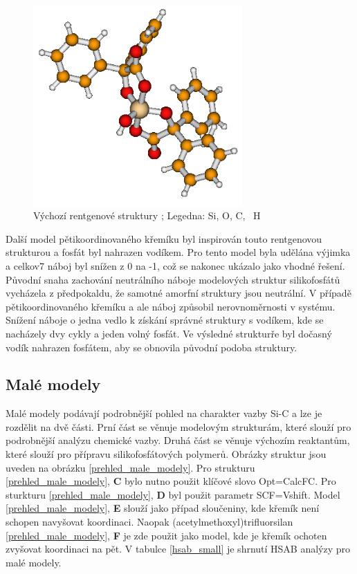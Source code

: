 \documentclass[
  digital, %
  table,   %
  lof,     %
  lot,     %
  oneside,
]{fithesis3}
\begin{document}
\begin{figure}
\begin{center}
\includegraphics[width=8cm]{rtg_5_koordinace.png}
\caption{Výchozí rentgenové struktury \cite{rtg_5};  Legedna:  Si,  O,  C, ~H}
\label{rtg_5}
\end{center}
\end{figure}
Další model pětikoordinovaného křemíku byl inspirován touto rentgenovou strukturou a fosfát byl nahrazen vodíkem. Pro tento model byla udělána výjimka a celkov7 náboj byl snížen z 0 na -1, což se nakonec ukázalo jako vhodné řešení. Původní snaha zachování neutrálního náboje modelových struktur silikofosfátů vycházela z předpokaldu, že samotné amorfní struktury jsou neutrální. V případě pětikoordinovaného křemíku a ale náboj způsobil nerovnoměrnosti v systému. Snížení náboje o jedna vedlo k získání správné struktury s vodíkem, kde se nacházely dvy cykly a jeden volný fosfát. Ve výsledné strukturře byl dočasný vodík nahrazen fosfátem, aby se obnovila původní podoba struktury.

\subsection{Malé modely}
Malé modely podávají podrobnější pohled na charakter vazby Si-C a lze je rozdělit na dvě části. Prní část se věnuje modelovým strukturám, které slouží pro podrobnější analýzu chemické vazby. Druhá část se věnuje výchozím reaktantům, které slouží pro přípravu silikofosfátových polymerů. Obrázky struktur jsou uveden na obrázku \ref{prehled_male_modely}. Pro strukturu  \ref{prehled_male_modely}, \textbf{C} bylo nutno použit klíčové slovo Opt=CalcFC. Pro sturkturu  \ref{prehled_male_modely},  \textbf{D} byl použit parametr SCF=Vshift. Model  \ref{prehled_male_modely}, \textbf{E} slouží jako případ sloučeniny, kde křemík není schopen navyšovat koordinaci. Naopak (acetylmethoxyl)trifluorsilan \ref{prehled_male_modely}, \textbf{F} je zde použit jako model, kde je křemík ochoten zvyšovat koordinaci na pět. V tabulce \ref{hsab_small} je shrnutí HSAB analýzy pro malé modely.
\end{document}
